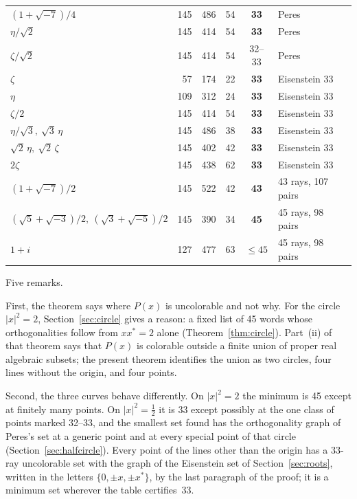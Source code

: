 \begin{table}[t]
\begin{tabular}{@{}lrrrcl@{}}
$(1+\sqrt{-7})/4$ & 145 & 486 & 54 & \textbf{33} & Peres \\
$\eta/\sqrt2$ & 145 & 414 & 54 & \textbf{33} & Peres \\
$\zeta/\sqrt2$ & 145 & 414 & 54 & 32--33 & Peres \\
$\zeta$ & 57 & 174 & 22 & \textbf{33} & Eisenstein 33 \\
$\eta$ & 109 & 312 & 24 & \textbf{33} & Eisenstein 33 \\
$\zeta/2$ & 145 & 414 & 54 & \textbf{33} & Eisenstein 33 \\
$\eta/\sqrt3,\ \sqrt3\,\eta$ & 145 & 486 & 38 & \textbf{33} & Eisenstein 33 \\
$\sqrt2\,\eta,\ \sqrt2\,\zeta$ & 145 & 402 & 42 & \textbf{33} & Eisenstein 33 \\
$2\zeta$ & 145 & 438 & 62 & \textbf{33} & Eisenstein 33 \\
$(1+\sqrt{-7})/2$ & 145 & 522 & 42 & \textbf{43} & 43 rays, 107 pairs \\
$(\sqrt5+\sqrt{-3})/2,\ (\sqrt3+\sqrt{-5})/2$ & 145 & 390 & 34 & \textbf{45} & 45 rays, 98 pairs \\
$1+i$ & 127 & 477 & 63 & $\le45$ & 45 rays, 98 pairs \\
\bottomrule
\end{tabular}
\end{table}

Five remarks.

First, the theorem says where $P(x)$ is uncolorable and not why.  For the circle $|x|^2=2$,
Section~\ref{sec:circle} gives a reason: a fixed list of 45 words whose orthogonalities follow
from $xx^{*}=2$ alone (Theorem~\ref{thm:circle}).  Part~(ii) of that theorem says that $P(x)$ is
colorable outside a finite union of proper real algebraic subsets; the present theorem
identifies the union as two circles, four lines without the origin, and four points.

Second, the three curves behave differently.  On $|x|^2=2$ the minimum is 45 except at
finitely many points.  On $|x|^2=\tfrac12$ it is 33 except possibly at the one class of
points marked 32--33, and the smallest set found has the orthogonality graph of Peres's set at
a generic point and at every special point of that circle (Section~\ref{sec:halfcircle}).
Every point of the lines other than the origin has a
33-ray uncolorable set with the graph of the Eisenstein set of Section~\ref{sec:roots}, written
in the letters $\{0,\pm x,\pm x^{*}\}$, by the last paragraph of the proof; it is a minimum set
wherever the table certifies~33.

